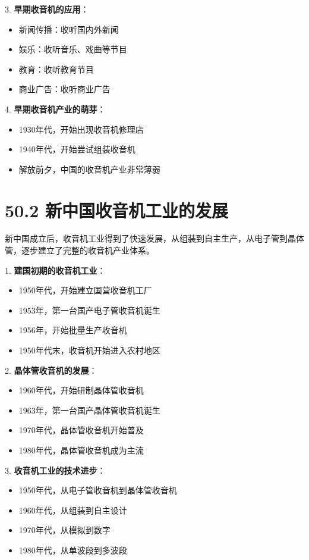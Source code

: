 \documentclass[12pt,UTF8]{ctexbook}
\begin{document}
3. \textbf{早期收音机的应用}：
   \begin{itemize}[leftmargin=3.5em]
   \item 新闻传播：收听国内外新闻
   \item 娱乐：收听音乐、戏曲等节目
   \item 教育：收听教育节目
   \item 商业广告：收听商业广告
   \end{itemize}

4. \textbf{早期收音机产业的萌芽}：
   \begin{itemize}[leftmargin=3.5em]
   \item 1930年代，开始出现收音机修理店
   \item 1940年代，开始尝试组装收音机
   \item 解放前夕，中国的收音机产业非常薄弱
   \end{itemize}

\section*{50.2 新中国收音机工业的发展}

新中国成立后，收音机工业得到了快速发展，从组装到自主生产，从电子管到晶体管，逐步建立了完整的收音机产业体系。

1. \textbf{建国初期的收音机工业}：
   \begin{itemize}[leftmargin=3.5em]
   \item 1950年代，开始建立国营收音机工厂
   \item 1953年，第一台国产电子管收音机诞生
   \item 1956年，开始批量生产收音机
   \item 1950年代末，收音机开始进入农村地区
   \end{itemize}

2. \textbf{晶体管收音机的发展}：
   \begin{itemize}[leftmargin=3.5em]
   \item 1960年代，开始研制晶体管收音机
   \item 1963年，第一台国产晶体管收音机诞生
   \item 1970年代，晶体管收音机开始普及
   \item 1980年代，晶体管收音机成为主流
   \end{itemize}

3. \textbf{收音机工业的技术进步}：
   \begin{itemize}[leftmargin=3.5em]
   \item 1950年代，从电子管收音机到晶体管收音机
   \item 1960年代，从组装到自主设计
   \item 1970年代，从模拟到数字
   \item 1980年代，从单波段到多波段
   \end{itemize}
\end{document}
